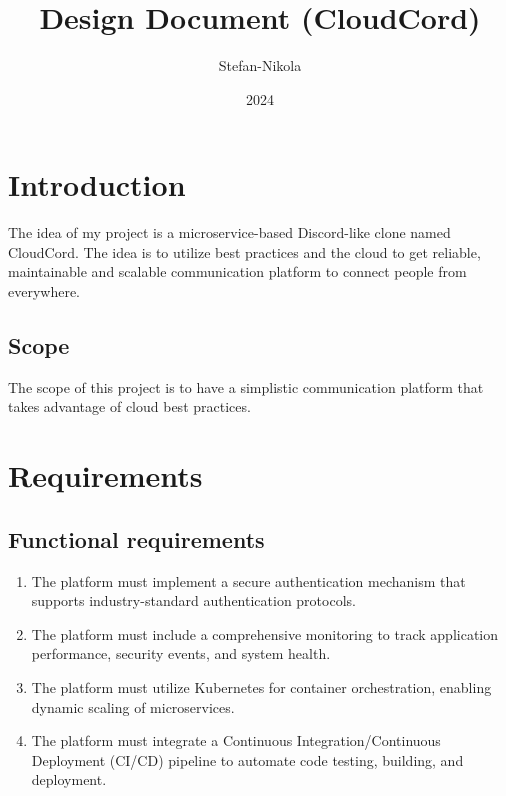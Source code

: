 \documentclass[12pt]{report}
\author{Stefan-Nikola}
\title{Design Document (CloudCord)}
\date{2024}
\begin{document}
\maketitle

\tableofcontents

\chapter{Introduction} 

The idea of my project is a microservice-based Discord-like clone named CloudCord. The idea is to utilize best practices and the cloud to get reliable, maintainable and scalable communication platform to connect people from everywhere.

\section{Scope} 

The scope of this project is to have a simplistic communication platform that takes advantage of cloud best practices. 

\chapter{Requirements} 

\section{Functional requirements} 

\begin{enumerate}

    \item The platform must implement a secure authentication mechanism that supports industry-standard authentication protocols.

    \item The platform must include a comprehensive monitoring to track application performance, security events, and system health.

    \item The platform must utilize Kubernetes for container orchestration, enabling dynamic scaling of microservices. 
  
    \item The platform must integrate a Continuous Integration/Continuous Deployment (CI/CD) pipeline to automate code testing, building, and deployment. 

\end{enumerate}
\end{document}

